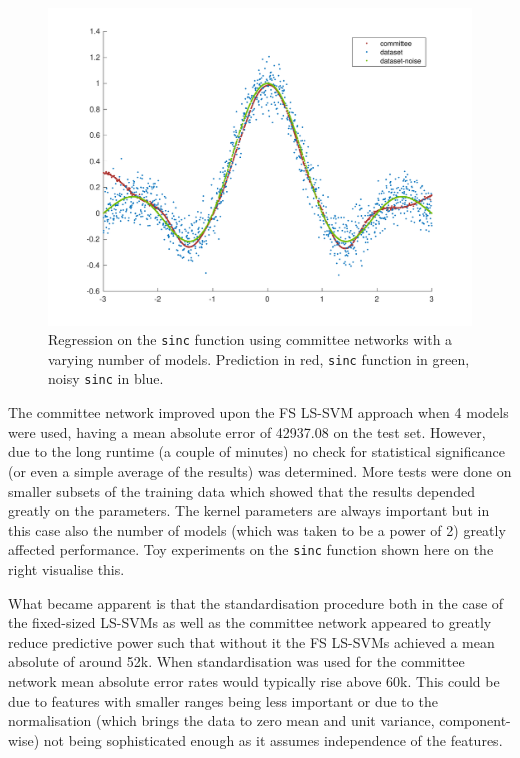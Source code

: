 \begin{figure}
\begin{minipage}{\linewidth}
\includegraphics[width=\linewidth]{../src/figures/committee/sinc_8_models}
    \caption*{$\#\ \text{models} = 8$}
\end{minipage}
\caption{Regression on the \texttt{sinc} function using committee networks with a varying number of models. Prediction in red, \texttt{sinc} function in green, noisy \texttt{sinc} in blue.}
\label{committeesinc}
\end{figure}

\par The committee network improved upon the FS LS-SVM approach when 4 models were used, having a mean absolute error of 42937.08 on the test set. However, due to the long runtime (a couple of minutes) no check for statistical significance (or even a simple average of the results) was determined. More tests were done on smaller subsets of the training data which showed that the results depended greatly on the parameters. The kernel parameters are always important but in this case also the number of models (which was taken to be a power of 2) greatly affected performance. Toy experiments on the \texttt{sinc} function shown here on the right visualise this.

\par What became apparent is that the standardisation procedure both in the case of the fixed-sized LS-SVMs as well as the committee network appeared to greatly reduce predictive power such that without it the FS LS-SVMs achieved a mean absolute of around 52k. When standardisation was used for the committee network mean absolute error rates would typically rise above 60k. This could be due to features with smaller ranges being less important or due to the normalisation (which brings the data to zero mean and unit variance, component-wise) not being sophisticated enough as it assumes independence of the features.

